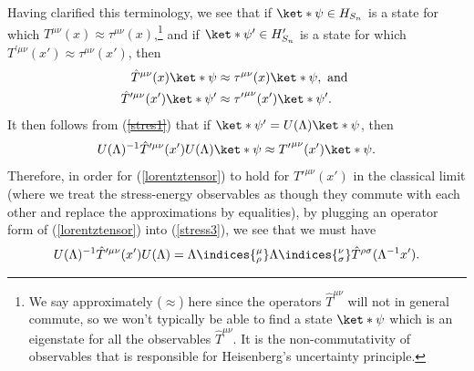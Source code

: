 \documentclass[12pt]{report}
\providecommand{\DIFadd}[1]{{\protect\color{blue}\uwave{#1}}} %
\providecommand{\DIFdel}[1]{{\protect\color{red}\sout{#1}}}                      %
\providecommand{\DIFaddbegin}{} %
\providecommand{\DIFaddend}{} %
\providecommand{\DIFdelbegin}{} %
\providecommand{\DIFdelend}{} %
\begin{document}
Having clarified this terminology, we see that if $\ket*{\psi}\in H_{S_n}$ is a state for which $T^{\mu\nu}(x)\approx \tau^{\mu\nu}(x)$,\footnote{We say approximately ($\approx$) here since the operators $\hat{T}^{\mu\nu}$ will not in general commute, so we won't typically be able to find a state $\ket*{\psi}$ which is an eigenstate for all the observables $\hat{T}^{\mu\nu}$. It is the non-commutativity of observables that is responsible for Heisenberg's uncertainty principle.} and if $\ket*{\psi'}\in H_{S_n}'$ is a state for which $T^{\prime\mu\nu}(x')\approx \tau^{\mu\nu}(x')$, then
\begin{subequations}\DIFaddbegin \label{stres0}
\DIFaddend \begin{align}
\hat{T}^{\mu\nu}(x)\ket*{\psi}&\approx\tau^{\mu\nu}(x)\ket*{\psi}, \text{ and }\label{stres1}\\ 
\hat{T}^{\prime\mu\nu}(x')\ket*{\psi'}&\approx{\tau'}^{\mu\nu}(x')\ket*{\psi'}.\DIFdelbegin %
\DIFdelend \DIFaddbegin \label{stres2}
\DIFaddend \end{align}
\end{subequations}
It then follows from (\DIFdelbegin \DIFdel{\ref{stres1}}\DIFdelend \DIFaddbegin \DIFadd{\ref{stres0}}\DIFaddend ) that if $\ket*{\psi'}=U(\Lambda)\ket*{\psi}$, then
\begin{equation}\label{stress3}
    U(\Lambda)^{-1}\hat{T}^{\prime\mu\nu}(x')U(\Lambda)\ket*{\psi}\approx{T'}^{\mu\nu}(x')\ket*{\psi}.
\end{equation}
Therefore, in order for (\ref{lorentztensor}) to hold for ${T'}^{\mu\nu}(x')$ in the classical limit (where we treat the stress-energy observables as though they commute with each other and replace the approximations by equalities), by plugging an operator form of  (\ref{lorentztensor}) into (\ref{stress3}), we see that we must have
\begin{equation}\label{TUrelation}
U(\Lambda)^{-1}\hat{T}^{\prime\mu\nu}(x')U(\Lambda)=\Lambda\indices{^\mu_\rho}\Lambda\indices{^\nu_\sigma}\hat{T}^{\rho\sigma}(\Lambda^{-1}x').
\end{equation}
\end{document}
